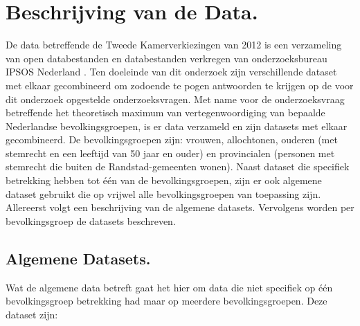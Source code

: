\newpage
\section{Beschrijving van de Data.}
\label{sec:meth}

De data betreffende de Tweede Kamerverkiezingen van 2012 is een verzameling van open databestanden en databestanden verkregen van onderzoeksbureau IPSOS Nederland \citeyearpar{IPSOS}.
Ten doeleinde van dit onderzoek zijn verschillende dataset met elkaar gecombineerd om zodoende te pogen antwoorden te krijgen op de voor dit onderzoek opgestelde onderzoeksvragen. Met name voor de onderzoeksvraag betreffende het theoretisch maximum van vertegenwoordiging van bepaalde Nederlandse bevolkingsgroepen, is er data verzameld en zijn datasets met elkaar gecombineerd. De bevolkingsgroepen zijn: vrouwen, allochtonen, ouderen (met stemrecht en een leeftijd van 50 jaar en ouder) en provincialen (personen met stemrecht die buiten de Randstad-gemeenten wonen). Naast dataset die specifiek betrekking hebben tot één van de bevolkingsgroepen, zijn er ook algemene dataset gebruikt die op vrijwel alle bevolkingsgroepen van toepassing zijn. Allereerst volgt een beschrijving van de algemene datasets. Vervolgens worden per bevolkingsgroep de datasets beschreven.

\subsection*{Algemene Datasets.}
Wat de algemene data betreft gaat het hier om data die niet specifiek op één bevolkingsgroep betrekking had maar op meerdere bevolkingsgroepen. Deze dataset zijn: \\


